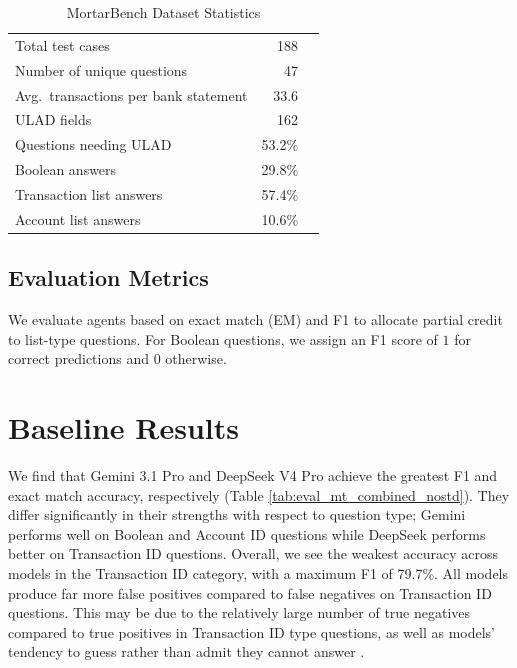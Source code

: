 \documentclass[11pt]{article}
\begin{document}
\begin{table}[!htp]\centering\small
\begin{tabular}{lrr}\toprule
Total test cases &188 \\
Number of unique questions &47 \\
Avg.\ transactions per bank statement &33.6 \\
ULAD fields &162 \\
Questions needing ULAD &53.2\% \\
Boolean answers &29.8\% \\
Transaction list answers &57.4\% \\
Account list answers &10.6\% \\
\bottomrule
\end{tabular}
\caption{MortarBench Dataset Statistics}\label{tab:mortarbench-stats}
\end{table}

\subsection{Evaluation Metrics}
We evaluate agents based on exact match (EM) and F1 to allocate partial credit to list-type questions.
For Boolean questions, we assign an F1 score of $1$ for correct predictions and $0$ otherwise.

\section{Baseline Results}

We find that Gemini 3.1 Pro and DeepSeek V4 Pro achieve the greatest F1 and exact match accuracy, respectively (Table \ref{tab:eval_mt_combined_nostd}). 
They differ significantly in their strengths with respect to question type; Gemini performs well on Boolean and Account ID questions while DeepSeek performs better on Transaction ID questions.
Overall, we see the weakest accuracy across models in the Transaction ID category, with a maximum F1 of 79.7\%.
All models produce far more false positives compared to false negatives on Transaction ID questions.
This may be due to the relatively large number of true negatives compared to true positives in Transaction ID type questions, as well as models' tendency to guess rather than admit they cannot answer \cite{kalai2026evaluating}.
\end{document}
